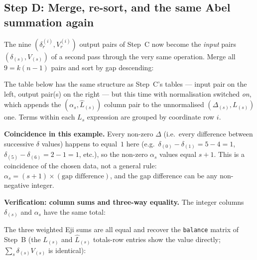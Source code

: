 \documentclass[11pt,a4paper]{article}
\newcommand{\eji}[2]{e^{#1}_{#2}}       %
\begin{document}
\subsection*{Step D: Merge, re-sort, and the same Abel summation again}

The nine $(\delta^{(i)}_r, V^{(i)}_r)$ output pairs of Step~C now become the
\emph{input} pairs $(\delta_{(s)}, V_{(s)})$ of a second pass through the very
same operation.  Merge all $9 = k(n{-}1)$ pairs and sort by gap descending:

The table below has the same structure as Step~C's tables — input pair on the
left, output pair(s) on the right — but this time with normalisation switched
\emph{on}, which appends the $(\alpha_s, \hat{L}_{(s)})$ column pair to the
unnormalised $(\Delta_{(s)}, L_{(s)})$ one.  Terms within each $L_s$
expression are grouped by coordinate row $i$.




\begin{tcolorbox}[notebox]
\textbf{Coincidence in this example.}  Every non-zero $\Delta$ (i.e.~every difference
between successive $\delta$ values)
happens to equal~$1$ here (e.g.\ $\delta_{(0)}-\delta_{(1)}=5-4=1$,
$\delta_{(5)}-\delta_{(6)}=2-1=1$, etc.), so the non-zero $\alpha_s$ values
equal $s{+}1$.  This is a coincidence of the chosen data, not a general rule:
$\alpha_s = (s{+}1)\times(\text{gap difference})$, and the gap difference can
be any non-negative integer.
\end{tcolorbox}

\begin{tcolorbox}[notebox]
\textbf{Verification: column sums and three-way equality.}
The integer columns $\delta_{(s)}$ and $\alpha_s$ have the same total:

The three weighted Eji sums are all equal and recover the
\texttt{balance} matrix of Step~B (the $L_{(s)}$ and ${\hat L}_{(s)}$ totals-row
entries show the value directly; $\sum_s\delta_{(s)}V_{(s)}$ is identical):

\end{tcolorbox}
\end{document}
